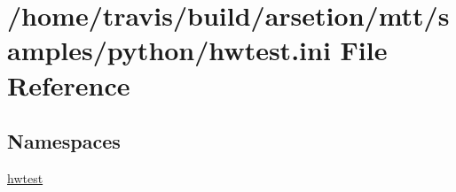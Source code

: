 \hypertarget{hwtest_8ini}{\section{/home/travis/build/arsetion/mtt/samples/python/hwtest.ini File Reference}
\label{hwtest_8ini}
}
\subsection*{Namespaces}
\begin{DoxyCompactItemize}
\item 
\hyperlink{namespacehwtest}{hwtest}
\end{DoxyCompactItemize}
